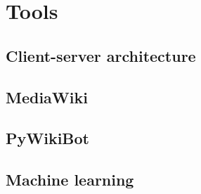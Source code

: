 \section{Tools}



\subsection{Client-server architecture}


\subsection{MediaWiki}


\subsection{PyWikiBot}


\subsection{Machine learning}
